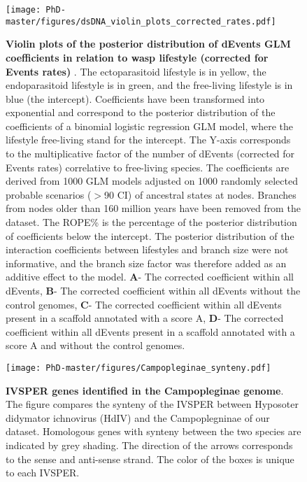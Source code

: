 \begin{figure}[!ht]
 \centering
  \texttt{[image: PhD-master/figures/dsDNA\_violin\_plots\_corrected\_rates.pdf]}
\caption[Paper1:Violin plot GLM distribution of corrected dEvent ratios]{\footnotesize\textbf{Violin plots of the posterior distribution of dEvents GLM coefficients in relation to wasp lifestyle (corrected for Events rates) }. The ectoparasitoid lifestyle is in yellow, the endoparasitoid lifestyle is in green, and the free-living lifestyle is in blue (the intercept). Coefficients have been transformed into exponential and correspond to the posterior distribution of the coefficients of a binomial logistic regression GLM model, where the lifestyle free-living stand for the intercept. The Y-axis corresponds to the multiplicative factor of the number of dEvents (corrected for Events rates) correlative to free-living species. The coefficients are derived from 1000 GLM models adjusted on 1000 randomly selected probable scenarios ($>$90 CI) of ancestral states at nodes. Branches from nodes older than 160 million years have been removed from the dataset. The ROPE\% is the percentage of the posterior distribution of coefficients below the intercept. The posterior distribution of the interaction coefficients between lifestyles and branch size were not informative, and the branch size factor was therefore added as an additive effect to the model. \textbf{A}- The corrected coefficient within all dEvents, \textbf{B}- The corrected coefficient within all dEvents without the control genomes, \textbf{C}- The corrected coefficient within all dEvents present in a scaffold annotated with a score A, \textbf{D}- The corrected coefficient within all dEvents present in a scaffold annotated with a score A and without the control genomes.}
\label{figure:dsDNA_violin_plots_corrected_rates}
\end{figure}


\begin{figure}[!ht]
 \centering
  \texttt{[image: PhD-master/figures/Campopleginae\_synteny.pdf]}
\caption[Paper1:IVSPER gene distribution along Campopleginae scaffolds]{ \textbf{IVSPER genes identified in the Campopleginae genome}. The figure compares the synteny of the IVSPER between Hyposoter didymator ichnovirus (HdIV) and  the Campoplegninae of our dataset. Homologous genes with
synteny between the two species are indicated by grey shading. The direction of the arrows corresponds to the sense and anti-sense strand. The color of the boxes is unique to each IVSPER. }
\label{figure:Campoplegniae_synteny}
\end{figure}

